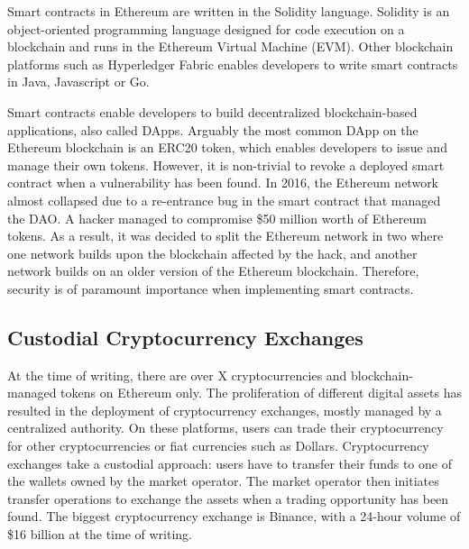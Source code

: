 Smart contracts in Ethereum are written in the Solidity language.
Solidity is an object-oriented programming language designed for code execution on a blockchain and runs in the Ethereum Virtual Machine (EVM).
Other blockchain platforms such as Hyperledger Fabric enables developers to write smart contracts in Java, Javascript or Go.

Smart contracts enable developers to build decentralized blockchain-based applications, also called DApps.
Arguably the most common DApp on the Ethereum blockchain is an ERC20 token, which enables developers to issue and manage their own tokens.
However, it is non-trivial to revoke a deployed smart contract when a vulnerability has been found.
In 2016, the Ethereum network almost collapsed due to a re-entrance bug in the smart contract that managed the DAO.
A hacker managed to compromise \$50 million worth of Ethereum tokens.
As a result, it was decided to split the Ethereum network in two where one network builds upon the blockchain affected by the hack, and another network builds on an older version of the Ethereum blockchain.
Therefore, security is of paramount importance when implementing smart contracts.

\subsection{Custodial Cryptocurrency Exchanges}
At the time of writing, there are over X cryptocurrencies and blockchain-managed tokens on Ethereum only.
The proliferation of different digital assets has resulted in the deployment of cryptocurrency exchanges, mostly managed by a centralized authority.
On these platforms, users can trade their cryptocurrency for other cryptocurrencies or fiat currencies such as Dollars.
Cryptocurrency exchanges take a custodial approach: users have to transfer their funds to one of the wallets owned by the market operator.
The market operator then initiates transfer operations to exchange the assets when a trading opportunity has been found.
The biggest cryptocurrency exchange is Binance, with a 24-hour volume of \$16 billion at the time of writing.

